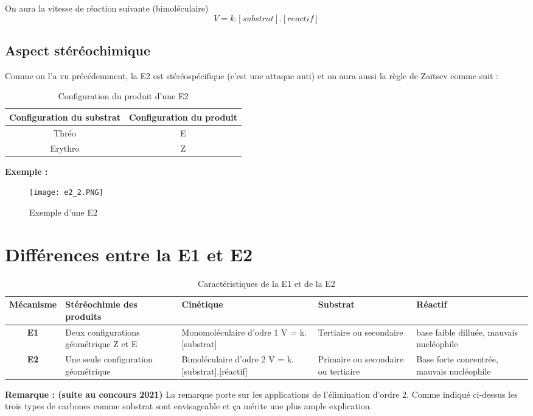 \documentclass[a4paper, oneside]{book}
\begin{document}
On aura la vitesse de réaction suivante (bimoléculaire) 
\[
    V = k.[substrat].[reactif]
\]
\subsection{Aspect stéréochimique}
Comme on l'a vu précédemment, la E2 est stéréospécifique (c'est une attaque anti) et on aura aussi la règle de Zaïtsev comme suit :
\begin{table}[!h]
    \centering
   \begin{tabular}{|c|c|}
        \hline
        \textbf{Configuration du substrat} & \textbf{Configuration du produit} \\
        \hline
        Thréo & E\\
        \hline
        Erythro & Z\\
        \hline
    \end{tabular} 
    \caption{Configuration du produit d'une E2}
    \label{tab:my_label}
\end{table}

\textbf{Exemple :}
\begin{figure}[!h]
    \centering
    \texttt{[image: e2\_2.PNG]}
    \caption{Exemple d'une E2}
    \label{fig:my_label}
\end{figure}
\newpage
\section{Différences entre la E1 et E2}
\begin{table}[!h]
    \centering
    \begin{tabular}{|c|p{5cm}|p{3cm}|p{2cm}|p{4cm}|}
        \hline
        \textbf{Mécanisme} & \textbf{Stéréochimie des produits} & \textbf{Cinétique} & \textbf{Substrat} & \textbf{Réactif} \\
        \hline
        \textbf{E1} & Deux configurations géométrique Z et E & Monomoléculaire d'odre 1 V = k.[substrat] & Tertiaire ou secondaire & base faible dilluée, mauvais nucléophile\\
        \hline
        \textbf{E2} & Une seule configuration géométrique & Bimoléculaire d'odre 2 V = k.[substrat].[réactif] & Primaire ou secondaire ou tertiaire & Base forte concentrée, mauvais nucléophile\\
        \hline
    \end{tabular}
    \caption{Caractéristiques de la E1 et de la E2}
    \label{tab:my_label}
\end{table}   
\textbf{Remarque : (suite au concours 2021)} La remarque porte sur les applications de l'élimination d'ordre 2. Comme indiqué ci-dessus les trois types de carbones comme substrat sont envisageable et ça mérite une plus ample explication. 
\end{document}
